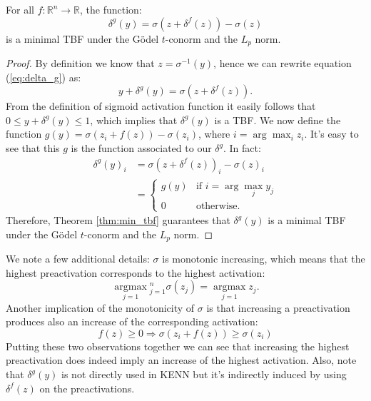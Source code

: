 \begin{theorem}
	For all $f:\mathbb{R}^n\rightarrow\mathbb{R}$, the function:
	\begin{equation}
	\delta^g(y) = \sigma(z+\delta^f(z))-\sigma(z)
	\label{eq:delta_g}
	\end{equation}
	is a minimal TBF under the Gödel $t$-conorm and the $L_p$ norm.
\end{theorem}
\begin{proof}
	By definition we know that $z = \sigma^{-1} (y)$, hence we can rewrite equation (\ref{eq:delta_g}) as:
	$$ y + \delta^g(y) = \sigma(z + \delta^f(z)).$$
	From the definition of sigmoid activation function it easily follows that $0 \leq y + \delta^g(y) \leq 1$, which implies that $\delta^g(y)$ is a TBF.
	We now define the function $g(y) = \sigma(z_i + f(z)) - \sigma(z_i)$, where $i = \arg\max_i z_i$. It's easy to see that this $g$ is the function associated to our $\delta^g$. In fact:
	\begin{align*}
	\delta^g(y)_i &= \sigma(z + \delta^f(z))_i - \sigma(z)_i \\
	&=\begin{cases}
	g(y) &\text{if } i=\arg\max_j y_j\\
	0 &\text{otherwise.}
	\end{cases}
	\end{align*}
	Therefore, Theorem \ref{thm:min_tbf} guarantees that $\delta^g(y)$ is a minimal TBF under the Gödel $t$-conorm and the $L_p$ norm.
	
\end{proof}

We note a few additional details: $\sigma$ is monotonic increasing, which means that the highest preactivation corresponds to the highest activation:
$$
\underset{j=1}{\operatorname{argmax}}{ }_{j=1}^{n} \sigma\left(z_{j}\right)=\underset{j=1}{\operatorname{argmax}} z_{j}.
$$
Another implication of the monotonicity of $\sigma$ is that increasing a preactivation produces also an increase of the corresponding activation:
$$
f(z) \geq 0 \Rightarrow \sigma\left(z_{i}+f(z)\right) \geq \sigma\left(z_{i}\right)
$$
Putting these two observations together we can see that increasing the highest preactivation does indeed imply an increase of the highest activation. Also, note that $\delta^g(y)$ is not directly used in KENN but it's indirectly induced by using $\delta^f(z)$ on the preactivations. 

